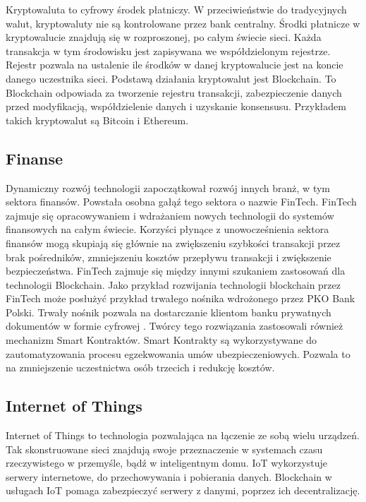 \documentclass[a4paper,12pt]{book}
\begin{document}
Kryptowaluta to cyfrowy środek płatniczy. W przeciwieństwie do tradycyjnych walut, kryptowaluty nie są kontrolowane przez bank centralny. Środki płatnicze w kryptowalucie znajdują się w rozproszonej, po całym świecie sieci. Każda transakcja w tym środowisku jest zapisywana we współdzielonym rejestrze. Rejestr pozwala na ustalenie ile środków w danej kryptowalucie jest na koncie danego uczestnika sieci. Podstawą działania kryptowalut jest Blockchain. To Blockchain odpowiada za tworzenie rejestru transakcji, zabezpieczenie danych przed modyfikacją, współdzielenie danych i uzyskanie konsensusu. Przykładem takich kryptowalut są Bitcoin i Ethereum. \cite{bitcoin}

\subsection{Finanse}

Dynamiczny rozwój technologii zapoczątkował rozwój innych branż, w tym sektora finansów. Powstała osobna gałąź tego sektora o nazwie FinTech. FinTech zajmuje się opracowywaniem i wdrażaniem nowych technologii do systemów finansowych na całym świecie. Korzyści płynące z unowocześnienia sektora finansów mogą skupiają się głównie na zwiększeniu szybkości transakcji przez brak pośredników, zmniejszeniu kosztów przepływu transakcji i zwiększenie bezpieczeństwa. FinTech zajmuje się między innymi szukaniem zastosowań dla technologii Blockchain. Jako przykład rozwijania technologii blockchain przez FinTech może posłużyć przykład trwałego nośnika wdrożonego przez PKO Bank Polski. Trwały nośnik pozwala na dostarczanie klientom banku prywatnych dokumentów w formie cyfrowej \cite{PKO}. Twórcy tego rozwiązania zastosowali również mechanizm Smart Kontraktów. Smart Kontrakty są wykorzystywane do zautomatyzowania procesu egzekwowania umów ubezpieczeniowych\cite{PKO-SMART}. Pozwala to na zmniejszenie uczestnictwa osób trzecich i redukcję kosztów.

\subsection{Internet of Things}

Internet of Things to technologia pozwalająca na łączenie ze sobą wielu urządzeń. Tak skonstruowane sieci znajdują swoje przeznaczenie w systemach czasu rzeczywistego w przemyśle, bądź w inteligentnym domu. IoT wykorzystuje serwery internetowe, do przechowywania i pobierania danych. Blockchain w usługach IoT pomaga zabezpieczyć serwery z danymi, poprzez ich decentralizację. \cite{abiot}
\end{document}
